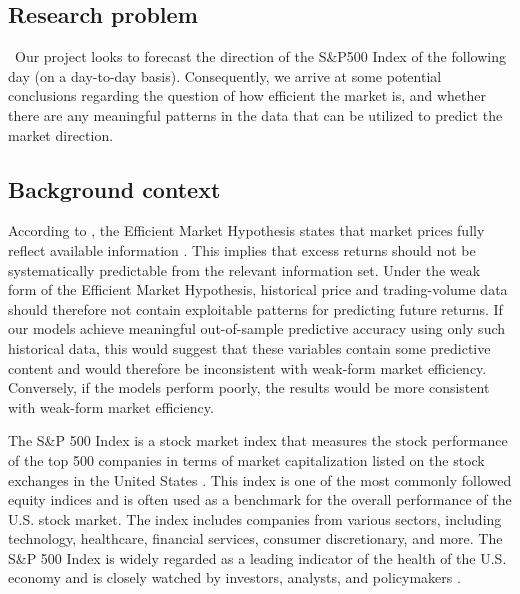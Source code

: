 \documentclass[11pt]{article}
\begin{document}
\subsection{Research problem}

\quad \ Our project looks to forecast the direction of the S\&P500 Index of the following day (on a day-to-day basis). Consequently, we arrive at some potential conclusions regarding the question of how efficient the market is, and whether there are any meaningful patterns in the data that can be utilized to predict the market direction.

\subsection{Background context}

\quad According to \citeauthor{wolfers_2004}, the Efficient Market Hypothesis states that market prices fully reflect available information . This implies that excess returns should not be systematically predictable from the relevant information set. Under the weak form of the Efficient Market Hypothesis, historical price and trading-volume data should therefore not contain exploitable patterns for predicting future returns. If our models achieve meaningful out-of-sample predictive accuracy using only such historical data, this would suggest that these variables contain some predictive content and would therefore be inconsistent with weak-form market efficiency. Conversely, if the models perform poorly, the results would be more consistent with weak-form market efficiency.

The S\&P 500 Index is a stock market index that measures the stock performance of the top 500 companies in terms of market capitalization listed on the stock exchanges in the United States \cite{spglobal_2024}. This index is one of the most commonly followed equity indices and is often used as a benchmark for the overall performance of the U.S. stock market. The index includes companies from various sectors, including technology, healthcare, financial services, consumer discretionary, and more. The S\&P 500 Index is widely regarded as a leading indicator of the health of the U.S. economy and is closely watched by investors, analysts, and policymakers \cite{investopedia_2024}.
\end{document}
